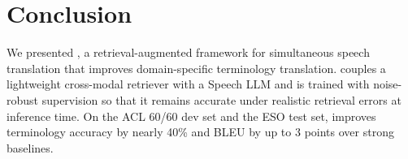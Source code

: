 \section{Conclusion}
We presented \method, a retrieval-augmented framework for simultaneous speech translation that improves domain-specific terminology translation. \method couples a lightweight cross-modal retriever with a Speech LLM and is trained with noise-robust supervision so that it remains accurate under realistic retrieval errors at inference time. On the ACL 60/60 dev set and the ESO test set, \method improves terminology accuracy by nearly 40\% and BLEU by up to 3 points over strong baselines.